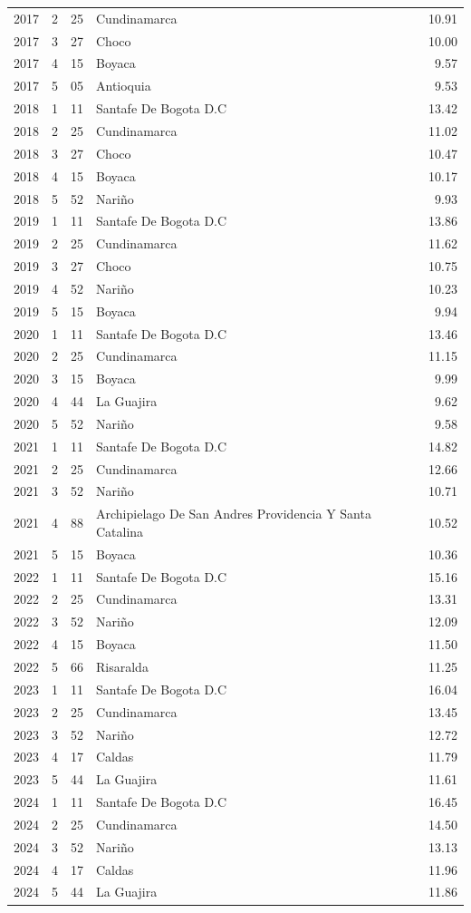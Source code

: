 \begin{tabular}{rrllr}
2017 & 2 & 25 & Cundinamarca & 10.91 \\
2017 & 3 & 27 & Choco & 10.00 \\
2017 & 4 & 15 & Boyaca & 9.57 \\
2017 & 5 & 05 & Antioquia & 9.53 \\
2018 & 1 & 11 & Santafe De Bogota D.C & 13.42 \\
2018 & 2 & 25 & Cundinamarca & 11.02 \\
2018 & 3 & 27 & Choco & 10.47 \\
2018 & 4 & 15 & Boyaca & 10.17 \\
2018 & 5 & 52 & Nariño & 9.93 \\
2019 & 1 & 11 & Santafe De Bogota D.C & 13.86 \\
2019 & 2 & 25 & Cundinamarca & 11.62 \\
2019 & 3 & 27 & Choco & 10.75 \\
2019 & 4 & 52 & Nariño & 10.23 \\
2019 & 5 & 15 & Boyaca & 9.94 \\
2020 & 1 & 11 & Santafe De Bogota D.C & 13.46 \\
2020 & 2 & 25 & Cundinamarca & 11.15 \\
2020 & 3 & 15 & Boyaca & 9.99 \\
2020 & 4 & 44 & La Guajira & 9.62 \\
2020 & 5 & 52 & Nariño & 9.58 \\
2021 & 1 & 11 & Santafe De Bogota D.C & 14.82 \\
2021 & 2 & 25 & Cundinamarca & 12.66 \\
2021 & 3 & 52 & Nariño & 10.71 \\
2021 & 4 & 88 & Archipielago De San Andres Providencia Y Santa Catalina & 10.52 \\
2021 & 5 & 15 & Boyaca & 10.36 \\
2022 & 1 & 11 & Santafe De Bogota D.C & 15.16 \\
2022 & 2 & 25 & Cundinamarca & 13.31 \\
2022 & 3 & 52 & Nariño & 12.09 \\
2022 & 4 & 15 & Boyaca & 11.50 \\
2022 & 5 & 66 & Risaralda & 11.25 \\
2023 & 1 & 11 & Santafe De Bogota D.C & 16.04 \\
2023 & 2 & 25 & Cundinamarca & 13.45 \\
2023 & 3 & 52 & Nariño & 12.72 \\
2023 & 4 & 17 & Caldas & 11.79 \\
2023 & 5 & 44 & La Guajira & 11.61 \\
2024 & 1 & 11 & Santafe De Bogota D.C & 16.45 \\
2024 & 2 & 25 & Cundinamarca & 14.50 \\
2024 & 3 & 52 & Nariño & 13.13 \\
2024 & 4 & 17 & Caldas & 11.96 \\
2024 & 5 & 44 & La Guajira & 11.86 \\
\bottomrule
\end{tabular}
